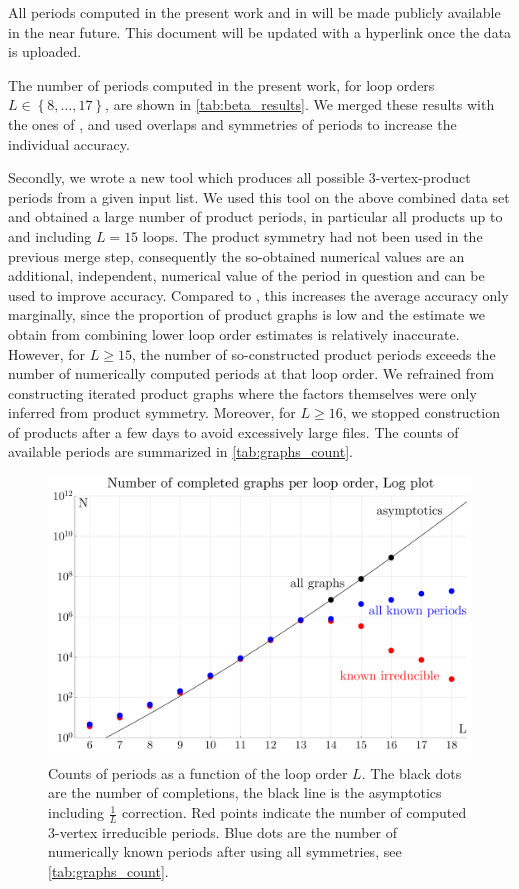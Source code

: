 \documentclass[11pt]{scrartcl}
\numberwithin{equation}{section}
\begin{document}
All periods computed in the present work and in \cite{balduf_statistics_2023} will be made publicly available in the near future. This document will be updated with a hyperlink once the data is uploaded.

The number of periods computed in the present work, for   loop orders $L\in \left \lbrace 8, \ldots, 17 \right \rbrace $, are shown in  \cref{tab:beta_results}.   
We merged these results with the ones of \cite{balduf_statistics_2023}, and used overlaps and symmetries of periods to increase the individual accuracy. 


Secondly, we wrote a new tool which produces all possible 3-vertex-product periods from a given input list. We used this tool on the above combined data set and obtained a large number of product periods, in particular all products up to and  including $L=15$ loops. The product symmetry had not been used in the previous merge step, consequently the so-obtained numerical values are an additional, independent, numerical value of the period in question and can be used to improve accuracy. Compared to \cite{balduf_statistics_2023}, this increases the average accuracy only marginally,   since the proportion of product graphs is low and the estimate we obtain from combining lower loop order estimates is relatively inaccurate. However, for $L\geq 15$, the number of so-constructed product periods exceeds the number of numerically computed periods at that loop order.  We refrained from constructing iterated product graphs where the factors themselves were only inferred from product symmetry. Moreover, for $L \geq 16$, we stopped construction of products after a few days to avoid excessively large files. The counts of available periods are summarized in \cref{tab:graphs_count}. 





\begin{figure}[htb]
	\centering
	\includegraphics[width=.6\linewidth]{figures/number_of_graphs}
	\caption{Counts of periods as a function of the loop order $L$. The black dots are the number of completions, the black line is the asymptotics \cite{borinsky_renormalized_2017} including $\frac 1 L$ correction. Red points indicate the number of computed 3-vertex irreducible periods. Blue dots are the number of numerically known periods after using all symmetries, see \cref{tab:graphs_count}.  }
	\label{fig:number_of_graphs}
\end{figure}
\end{document}
